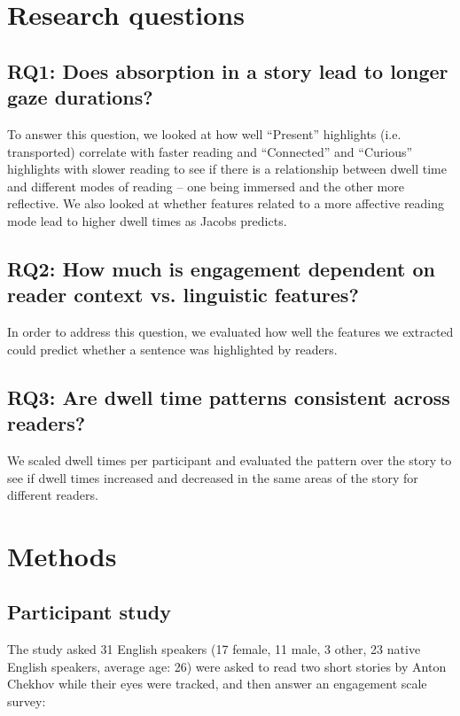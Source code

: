 \documentclass[11pt]{article}
\begin{document}
\section{Research questions}

\subsection{RQ1: Does absorption in a story lead to longer gaze durations?}
\label{subsection:rq1}

To answer this question, we looked at how well “Present” highlights (i.e. transported) correlate with faster reading and “Connected” and “Curious” highlights with slower reading to see if there is a relationship between dwell time and different modes of reading -- one being immersed and the other more reflective. We also looked at whether features related to a more affective reading mode lead to higher dwell times as Jacobs predicts.

\subsection{RQ2: How much is engagement dependent on reader context vs. linguistic features?}
\label{subsection:rq2}

In order to address this question, we evaluated how well the features we extracted could predict whether a sentence was highlighted by readers.

\subsection{RQ3: Are dwell time patterns consistent across readers?}
\label{subsection:rq3}

We scaled dwell times per participant and evaluated the pattern over the story to see if dwell times increased and decreased in the same areas of the story for different readers.

\section{Methods}

\subsection{Participant study}

The study asked 31 English speakers (17 female, 11 male, 3 other, 23 native English speakers, average age: 26) were asked to read two short stories by Anton Chekhov while their eyes were tracked, and then answer an engagement scale survey:
\end{document}
